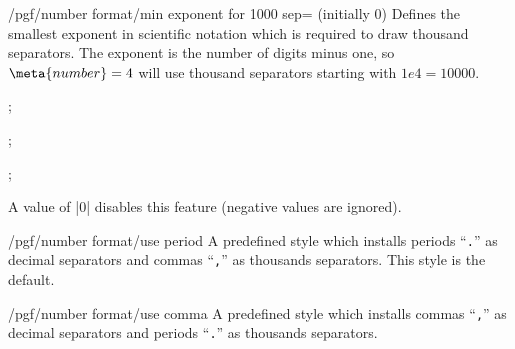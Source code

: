 \begin{key}{/pgf/number format/min exponent for 1000 sep= (initially 0)}
  Defines the smallest exponent in scientific notation which is
  required to draw thousand separators. The exponent is the number of
  digits minus one, so $\meta{number}=4$ will use thousand separators
  starting with $1e4 = 10000$. 
\begin{codeexample}[]
; 
\end{codeexample}

\begin{codeexample}[]
; 
\end{codeexample}
\begin{codeexample}[]
; 
\end{codeexample}
  \noindent A value of |0| disables this feature (negative values are
  ignored). 
\end{key}

\begin{key}{/pgf/number format/use period}
  A predefined style which installs periods ``\texttt{.}'' as decimal
  separators and commas ``\texttt{,}'' as thousands separators. This
  style is the default. 

\begin{codeexample}[]
\end{codeexample}
\begin{codeexample}[]
\end{codeexample}
\end{key}

\begin{key}{/pgf/number format/use comma}
  A predefined style which installs commas ``\texttt{,}'' as decimal
  separators and periods ``\texttt{.}'' as thousands separators. 

\begin{codeexample}[]
\end{codeexample}
\begin{codeexample}[]
\end{codeexample}
\end{key}

